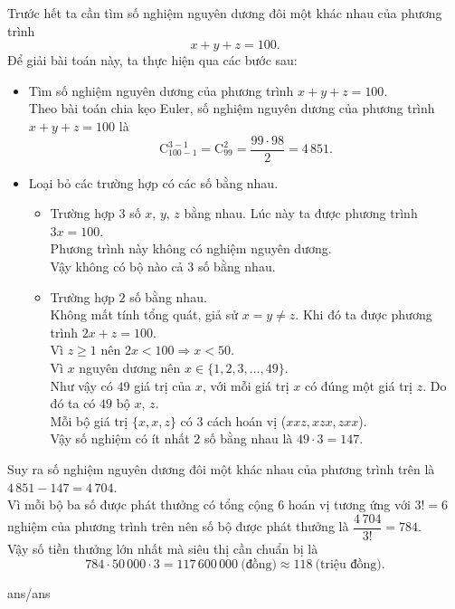 \begin{ex}
{		Trước hết ta cần tìm số nghiệm nguyên dương đôi một khác nhau của phương trình 
		\[ x + y + z = 100.\]
		Để giải bài toán này, ta thực hiện qua các bước sau:
		\begin{itemize}
			\item[B1:] Tìm số nghiệm nguyên dương của phương trình $x + y + z = 100$.\\
			Theo bài toán chia kẹo Euler, số nghiệm nguyên dương của phương trình $x + y + z = 100$ là
			\[ \mathrm{C}_{100-1}^{3-1} = \mathrm{C}_{99}^2 = \dfrac{99 \cdot 98}{2} = 4\,851.\]
			\item[B2:] Loại bỏ các trường hợp có các số bằng nhau.
			\begin{itemize}
				\item Trường hợp $3$ số $x$, $y$, $z$ bằng nhau. Lúc này ta được phương trình $3x = 100$.\\
				Phương trình này không có nghiệm nguyên dương. \\
				Vậy không có bộ nào cả $3$ số bằng nhau.
				\item Trường hợp $2$ số bằng nhau.\\
				Không mất tính tổng quát, giả sử $x = y \neq z$. Khi đó ta được phương trình $2x + z = 100$.\\
				Vì $z \ge 1$ nên $2x < 100 \Rightarrow x < 50$.\\
				Vì $x$ nguyên dương nên $x \in \{1, 2, 3, \dots, 49\}$.\\
				Như vậy có $49$ giá trị của $x$, với mỗi giá trị $x$ có đúng một giá trị $z$. Do đó ta có $49$ bộ $x$, $z$.\\
				Mỗi bộ giá trị $\{x, x, z\}$ có $3$ cách hoán vị ($xxz, xzx, zxx$).\\
				Vậy số nghiệm có ít nhất $2$ số bằng nhau là $49 \cdot 3 = 147$.
			\end{itemize}
		\end{itemize}
		Suy ra số nghiệm nguyên dương đôi một khác nhau của phương trình trên là $4\,851 - 147 = 4\,704$.\\
		Vì mỗi bộ ba số được phát thưởng có tổng cộng $6$ hoán vị tương ứng với $3!=6$ nghiệm của phương trình trên nên số bộ được phát thưởng là $\dfrac{4\,704}{3!} = 784$.\\
		Vậy số tiền thưởng lớn nhất mà siêu thị cần chuẩn bị là
		\[ 784 \cdot 50\,000\cdot 3 = 117\,600\,000 ~\text{(đồng)} \approx 118~\text{(triệu đồng)}.\]
	}
\end{ex}

\begin{indapan}
	{ans/ans\currfilebase}
\end{indapan}